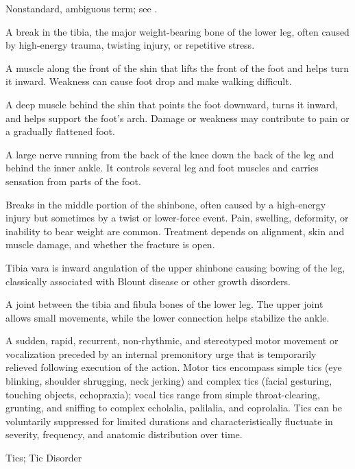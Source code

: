  Nonstandard, ambiguous term; see .

 A break in the tibia, the major weight-bearing bone of the lower leg, often caused by high-energy trauma, twisting injury, or repetitive stress.

 A muscle along the front of the shin that lifts the front of the foot and helps turn it inward. Weakness can cause foot drop and make walking difficult.

 A deep muscle behind the shin that points the foot downward, turns it inward, and helps support the foot’s arch. Damage or weakness may contribute to pain or a gradually flattened foot.

 A large nerve running from the back of the knee down the back of the leg and behind the inner ankle. It controls several leg and foot muscles and carries sensation from parts of the foot.

 Breaks in the middle portion of the shinbone, often caused by a high-energy injury but sometimes by a twist or lower-force event. Pain, swelling, deformity, or inability to bear weight are common. Treatment depends on alignment, skin and muscle damage, and whether the fracture is open.

 Tibia vara is inward angulation of the upper shinbone causing bowing of the leg, classically associated with Blount disease or other growth disorders.

 A joint between the tibia and fibula bones of the lower leg. The upper joint allows small movements, while the lower connection helps stabilize the ankle.

 A sudden, rapid, recurrent, non-rhythmic, and stereotyped motor movement or vocalization preceded by an internal premonitory urge that is temporarily relieved following execution of the action. Motor tics encompass simple tics (eye blinking, shoulder shrugging, neck jerking) and complex tics (facial gesturing, touching objects, echopraxia); vocal tics range from simple throat-clearing, grunting, and sniffing to complex echolalia, palilalia, and coprolalia. Tics can be voluntarily suppressed for limited durations and characteristically fluctuate in severity, frequency, and anatomic distribution over time.

\synonyms
Tics; Tic Disorder

